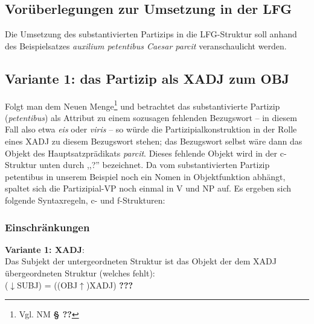 \documentclass[12pt,a4paper]{article}
\begin{document}
\subsection{Vorüberlegungen zur Umsetzung in der LFG}
Die Umsetzung des substantivierten Partizips in die LFG-Struktur soll anhand des Beispielsatzes \textit{auxilium petentibus Caesar parcit} veranschaulicht werden.


\subsection{Variante 1: das Partizip als XADJ zum OBJ}
Folgt man dem Neuen Menge\footnote{Vgl. NM \textbf{§ ??}} und betrachtet das substantivierte Partizip (\textit{petentibus}) als Attribut zu einem sozusagen fehlenden Bezugswort -- in diesem Fall also etwa \textit{eis} oder \textit{viris} -- so würde die Partizipialkonstruktion in der Rolle eines XADJ zu diesem Bezugswort stehen; das Bezugswort selbst wäre dann das Objekt des Hauptsatzprädikats \textit{parcit}. Dieses fehlende Objekt wird in der c-Struktur unten durch ,,?'' bezeichnet. Da vom substantivierten Partizip petentibus in unserem Beispiel noch ein Nomen in Objektfunktion abhängt, spaltet sich die Partizipial-VP noch einmal in V und NP auf. Es ergeben sich folgende Syntaxregeln, c- und f-Strukturen:\\

\subsubsection{Einschränkungen}
\textbf{Variante 1: XADJ}:\\
Das Subjekt der untergeordneten Struktur ist das Objekt der dem XADJ übergeordneten Struktur (welches fehlt): \\
($\downarrow$SUBJ) = ((OBJ$\uparrow$)XADJ) \textbf{???} \\
\end{document}
